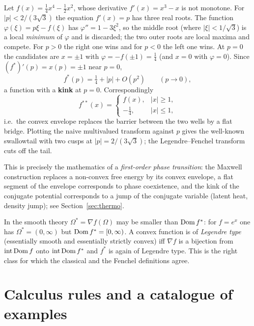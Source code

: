 \begin{example}\label{ex:doublewell}
Let $f(x)=\tfrac14x^4-\tfrac12x^2$, whose derivative $f'(x)=x^3-x$ is not
monotone.  For $|p|<2/(3\sqrt3)$ the equation $f'(x)=p$ has three real roots.
The function $\varphi(\xi)=p\xi-f(\xi)$ has $\varphi''=1-3\xi^2$, so the
middle root (where $|\xi|<1/\sqrt3$) is a local \emph{minimum} of $\varphi$
and is discarded; the two outer roots are local maxima and compete.  For
$p>0$ the right one wins and for $p<0$ the left one wins.  At $p=0$ the
candidates are $x=\pm1$ with $\varphi=-f(\pm1)=\tfrac14$ (and $x=0$ with
$\varphi=0$).  Since $(f^*)'(p)=x(p)=\pm1$ near $p=0$,
\[
  f^*(p)=\tfrac14+|p|+O(p^2)\qquad(p\to0),
\]
a function with a \textbf{kink} at $p=0$.  Correspondingly
\[
  f^{**}(x)=\begin{cases}
  f(x), & |x|\ge1,\\[2pt] -\tfrac14, & |x|\le1,
  \end{cases}
\]
i.e.\ the convex envelope replaces the barrier between the two wells by a
flat bridge.  Plotting the naive multivalued transform against $p$ gives the
well-known swallowtail with two cusps at $|p|=2/(3\sqrt3)$; the
Legendre--Fenchel transform cuts off the tail.
\end{example}

This is precisely the mathematics of a \emph{first-order phase transition}:
the Maxwell construction replaces a non-convex free energy by its convex
envelope, a flat segment of the envelope corresponds to phase coexistence, and
the kink of the conjugate potential corresponds to a jump of the conjugate
variable (latent heat, density jump); see Section~\ref{sec:thermo}.

\begin{remark}
In the smooth theory $\Omega^*=\nabla f(\Omega)$ may be smaller than
$\operatorname{Dom} f^*$: for $f=e^x$ one has $\Omega^*=(0,\infty)$ but
$\operatorname{Dom} f^*=[0,\infty)$.  A convex function is of \emph{Legendre type}
(essentially smooth and essentially strictly convex) iff $\nabla f$ is a
bijection from $\operatorname{int}\operatorname{Dom} f$ onto $\operatorname{int}\operatorname{Dom} f^*$
and $f^*$ is again of Legendre type.
This is the right class for which the classical and the Fenchel definitions
agree.
\end{remark}

\section{Calculus rules and a catalogue of examples}\label{sec:examples}

